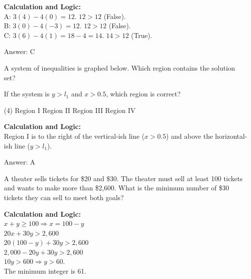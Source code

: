 \documentclass[11pt,paper=a4,answers]{exam}
\begin{document}
\begin{questions}
\begin{solution}
\textbf{Calculation and Logic:} \\
A: $3(4) - 4(0) = 12$. $12 > 12$ (False). \\
B: $3(0) - 4(-3) = 12$. $12 > 12$ (False). \\
C: $3(6) - 4(1) = 18 - 4 = 14$. $14 > 12$ (True).

\vspace{15pt}
Answer: \colorbox{yellow!100}{C}
\end{solution}

\question
A system of inequalities is graphed below. Which region contains the solution set?

\begin{center}
\end{center}

If the system is $y > l_1$ and $x > 0.5$, which region is correct?
\begin{tasks}(4)
    \task Region I
    \task Region II
    \task Region III
    \task Region IV
\end{tasks}

\begin{solution}
\textbf{Calculation and Logic:} \\
Region I is to the right of the vertical-ish line ($x > 0.5$) and above the horizontal-ish line ($y > l_1$).

\vspace{15pt}
Answer: \colorbox{yellow!100}{A}
\end{solution}

\question
A theater sells tickets for \$20 and \$30. The theater must sell at least 100 tickets and wants to make more than \$2,600. What is the minimum number of \$30 tickets they can sell to meet both goals?

\begin{solution}
\textbf{Calculation and Logic:} \\
$x + y \ge 100 \Rightarrow x = 100 - y$ \\
$20x + 30y > 2,600$ \\
$20(100 - y) + 30y > 2,600$ \\
$2,000 - 20y + 30y > 2,600$ \\
$10y > 600 \Rightarrow y > 60$. \\
The minimum integer is 61.


\end{solution}
\end{questions}
\end{document}
